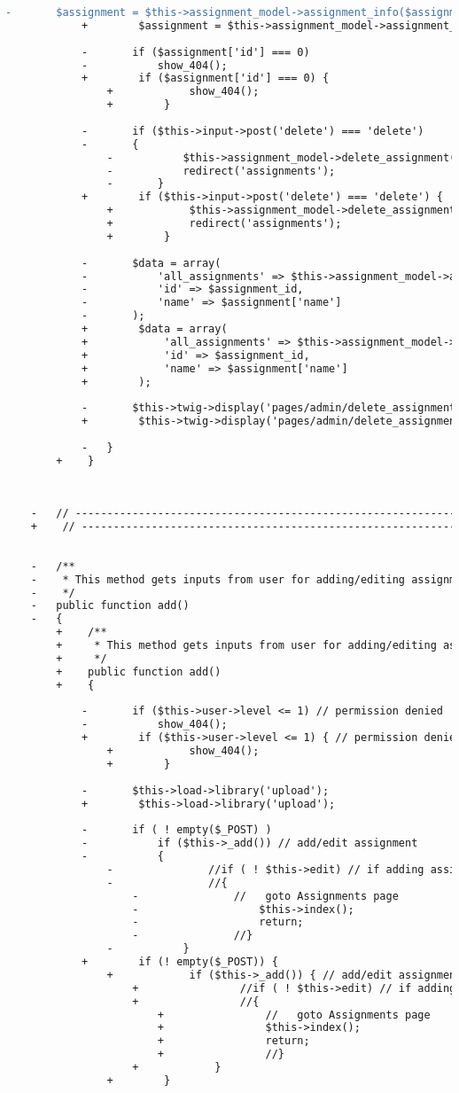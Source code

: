 \begin{lstlisting}[language=diff, caption=Perubahan pada kode Assignments.php]
			-		$assignment = $this->assignment_model->assignment_info($assignment_id);
			+        $assignment = $this->assignment_model->assignment_info($assignment_id);
			
			-		if ($assignment['id'] === 0)
			-			show_404();
			+        if ($assignment['id'] === 0) {
				+            show_404();
				+        }
			
			-		if ($this->input->post('delete') === 'delete')
			-		{
				-			$this->assignment_model->delete_assignment($assignment_id);
				-			redirect('assignments');
				-		}
			+        if ($this->input->post('delete') === 'delete') {
				+            $this->assignment_model->delete_assignment($assignment_id);
				+            redirect('assignments');
				+        }
			
			-		$data = array(
			-			'all_assignments' => $this->assignment_model->all_assignments(),
			-			'id' => $assignment_id,
			-			'name' => $assignment['name']
			-		);
			+        $data = array(
			+            'all_assignments' => $this->assignment_model->all_assignments(),
			+            'id' => $assignment_id,
			+            'name' => $assignment['name']
			+        );
			
			-		$this->twig->display('pages/admin/delete_assignment.twig', $data);
			+        $this->twig->display('pages/admin/delete_assignment.twig', $data);
			
			-	}
		+    }
	
	
	
	-	// ------------------------------------------------------------------------
	+    // ------------------------------------------------------------------------
	
	
	-	/**
	-	 * This method gets inputs from user for adding/editing assignment
	-	 */
	-	public function add()
	-	{
		+    /**
		+     * This method gets inputs from user for adding/editing assignment
		+     */
		+    public function add()
		+    {
			
			-		if ($this->user->level <= 1) // permission denied
			-			show_404();
			+        if ($this->user->level <= 1) { // permission denied
				+            show_404();
				+        }
			
			-		$this->load->library('upload');
			+        $this->load->library('upload');
			
			-		if ( ! empty($_POST) )
			-			if ($this->_add()) // add/edit assignment
			-			{
				-				//if ( ! $this->edit) // if adding assignment (not editing)
				-				//{
					-				//   goto Assignments page
					-					$this->index();
					-					return;
					-				//}
				-			}
			+        if (! empty($_POST)) {
				+            if ($this->_add()) { // add/edit assignment
					+                //if ( ! $this->edit) // if adding assignment (not editing)
					+                //{
						+                //   goto Assignments page
						+                $this->index();
						+                return;
						+                //}
					+            }
				+        }
			

\end{lstlisting}
